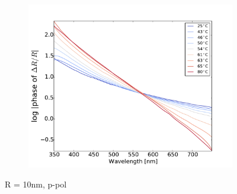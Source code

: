\begin{figure}
    \begin{subfigure}[b]{0.3\textwidth}
        \centering
        \includegraphics[width=\textwidth]{Results/Sim1/dRphase_visible_log.pdf}
        \caption{}
    \end{subfigure}
    \caption{R = 10nm, p-pol}
\end{figure}
%

